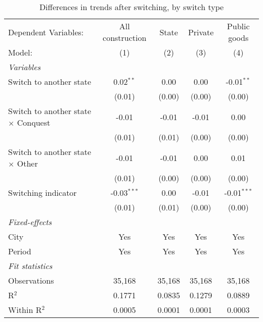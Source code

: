 \begin{table}[htbp]
   \caption{\label{tab:baseline_10y} Differences in trends after switching, by switch type}
   \centering
   \begin{tabular}{lcccc}
      \tabularnewline \midrule \midrule
      Dependent Variables:                       & All construction & State  & Private & Public goods\\  
      Model:                                     & (1)              & (2)    & (3)     & (4)\\  
      \midrule
      \emph{Variables}\\
      Switch to another state                    & 0.02$^{**}$      & 0.00   & 0.00    & -0.01$^{**}$\\   
                                                 & (0.01)           & (0.00) & (0.00)  & (0.00)\\   
      Switch to another state $\times$ Conquest  & -0.01            & -0.01  & -0.01   & 0.00\\   
                                                 & (0.01)           & (0.01) & (0.00)  & (0.00)\\   
      Switch to another state $\times$ Other     & -0.01            & -0.01  & 0.00    & 0.01\\   
                                                 & (0.01)           & (0.00) & (0.00)  & (0.00)\\   
      Switching indicator                        & -0.03$^{***}$    & 0.00   & -0.01   & -0.01$^{***}$\\   
                                                 & (0.01)           & (0.01) & (0.00)  & (0.00)\\   
      \midrule
      \emph{Fixed-effects}\\
      City                                       & Yes              & Yes    & Yes     & Yes\\  
      Period                                     & Yes              & Yes    & Yes     & Yes\\  
      \midrule
      \emph{Fit statistics}\\
      Observations                               & 35,168           & 35,168 & 35,168  & 35,168\\  
      R$^2$                                      & 0.1771           & 0.0835 & 0.1279  & 0.0889\\  
      Within R$^2$                               & 0.0005           & 0.0001 & 0.0001  & 0.0003\\  
      \midrule \midrule
      

\end{tabular}
\end{table}
